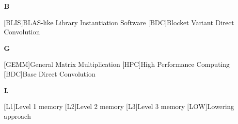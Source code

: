 \textbf{\newline\Large B}
\begin{acronym_expdlist}
    [BLIS]{BLAS-like Library Instantiation Software}
    [BDC]{Blocket Variant Direct Convolution}
\end{acronym_expdlist}

\textbf{\newline\Large G}
\begin{acronym_expdlist}
    [GEMM]{General Matrix Multiplication}
    [HPC]{High Performance Computing}
    [BDC]{Base Direct Convolution}
\end{acronym_expdlist}

\textbf{\newline\Large L}
\begin{acronym_expdlist}
    [L1]{Level 1 memory}
    [L2]{Level 2 memory}
    [L3]{Level 3 memory}
    [LOW]{Lowering approach}
\end{acronym_expdlist}

